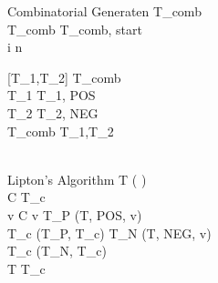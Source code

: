 


\begin{pseudocode}{Combinatorial Generate}{n}
	T_{comb} \GETS \emptyset \\
	T_{comb} \GETS {}T_{comb}, start\text{)} \\ 

	\FOR i   n \DO
		\BEGIN
		
		[T_1,T_2] \GETS {} T_{comb}\text{)}\\
		T_1 \GETS {}T_1, POS \text{)}\\
		T_2 \GETS {}T_2, NEG \text{)}\\
		T_{comb} \GETS {}T_1,T_2\text{)}\\
	\END
	\\
\end{pseudocode}


\begin{pseudocode}{Lipton's Algorithm}{\phi}
T \GETS {}( \mid \phi \mid) \\
\FOREACH {} C  \phi \DO
	\BEGIN
	T_c \GETS \emptyset \\
	\FOREACH {} v  C \DO
		\BEGIN
			\IF v  \THEN
				\BEGIN
					T_P \GETS {}(T, POS, v)\\
					T_c \GETS {}(T_P, T_c)						
				\END
			\ELSE
				\BEGIN
					T_N \GETS {}(T, NEG, v)\\
					T_c \GETS {}(T_N, T_c)						
				\END
		\END
	\\
	T \GETS T_c\\
	\END
\\
\end{pseudocode}
